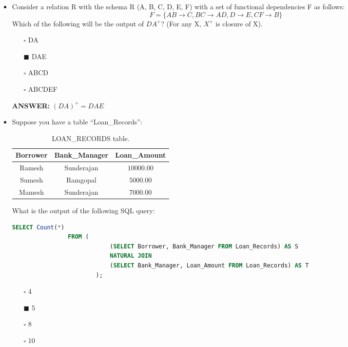 \documentclass[10pt]{article}
\newcommand{\lightrule}{%
	\arrayrulecolor{black!30}%
	\midrule[\lightrulewidth]%
	\arrayrulecolor{black}}
\begin{document}
\begin{itemize}
		\item Consider a relation R with the schema R (A, B, C, D, E, F) with a set of functional dependencies F as follows: $$F = \{AB \rightarrow C, BC \rightarrow AD, D \rightarrow E, CF \rightarrow B\}$$
		Which of the following will be the output of $DA^+$? (For any X, $X^+$ is closure of X).
			\begin{enumerate}
				\item[$\square$] DA
				\item[$\blacksquare$] DAE
				\item[$\square$] ABCD
				\item[$\square$] ABCDEF
			\end{enumerate}
			\color{red} \textbf{ANSWER:} \color{black} $(DA)^+ =  DAE$

		\newpage

		\item Suppose you have a table “Loan\_Records”:
			\begin{table}[H]
				\centering
				\begin{tabular}{@{} *{3}{c} @{}}
					\toprule
						\textbf{Borrower} & \textbf{Bank\_Manager} & \textbf{Loan\_Amount} \\
					\midrule
						Ramesh & Sunderajan & $10000.00$ \\ 
					\lightrule
						Sumesh & Ramgopal & $5000.00$ \\ 
					\lightrule
						Mamesh & Sunderajan & $7000.00$ \\ 
					\bottomrule
				\end{tabular}
				\caption{LOAN\_RECORDS table.}
			\end{table}

			What is the output of the following SQL query: 
			\begin{lstlisting}[language=SQL,firstline=1, lastline=6] 
				SELECT Count(*) 
				FROM (
							(SELECT Borrower, Bank_Manager FROM Loan_Records) AS S 
							NATURAL JOIN 
							(SELECT Bank_Manager, Loan_Amount FROM Loan_Records) AS T
						);
			\end{lstlisting}

			\begin{enumerate}
				\item[$\square$] 4
				\item[$\blacksquare$] 5
				\item[$\square$] 8
				\item[$\square$] 10
			\end{enumerate}


\end{itemize}
\end{document}
